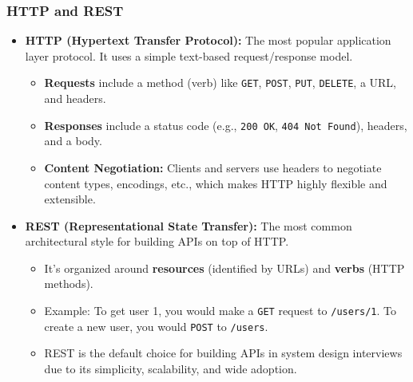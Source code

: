 \documentclass{article}
\begin{document}
\subsubsection{HTTP and REST}
\begin{itemize}
    \item \textbf{HTTP (Hypertext Transfer Protocol):} The most popular application layer protocol. It uses a simple text-based request/response model.
    \begin{itemize}
        \item \textbf{Requests} include a method (verb) like \texttt{GET}, \texttt{POST}, \texttt{PUT}, \texttt{DELETE}, a URL, and headers.
        \item \textbf{Responses} include a status code (e.g., \texttt{200 OK}, \texttt{404 Not Found}), headers, and a body.
        \item \textbf{Content Negotiation:} Clients and servers use headers to negotiate content types, encodings, etc., which makes HTTP highly flexible and extensible.
    \end{itemize}
    \item \textbf{REST (Representational State Transfer):} The most common architectural style for building APIs on top of HTTP.
    \begin{itemize}
        \item It's organized around \textbf{resources} (identified by URLs) and \textbf{verbs} (HTTP methods).
        \item Example: To get user 1, you would make a \texttt{GET} request to \texttt{/users/1}. To create a new user, you would \texttt{POST} to \texttt{/users}.
        \item REST is the default choice for building APIs in system design interviews due to its simplicity, scalability, and wide adoption.
    \end{itemize}
\end{itemize}
\end{document}
